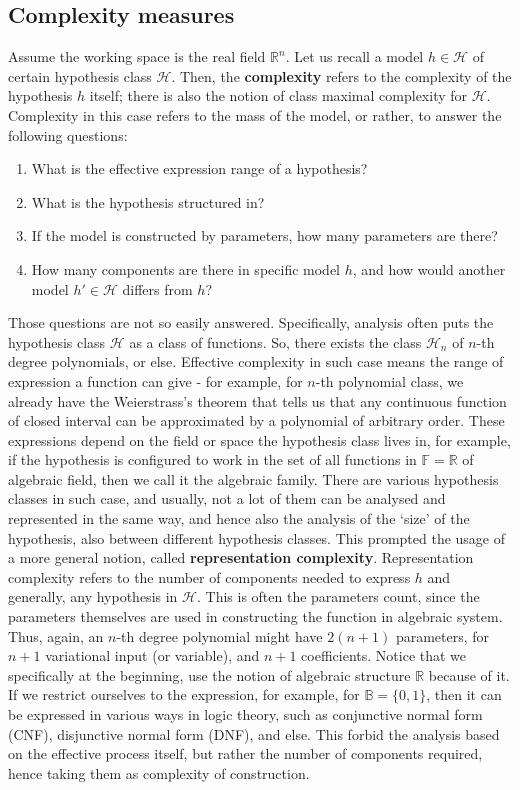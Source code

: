 \documentclass[10pt,oneside,oldfontcommands,dvipsnames,article]{memoir}
\begin{document}
\subsection{Complexity measures}

Assume the working space is the real field $\mathbb{R}^{n}$. Let us recall a model $h\in\mathcal{H}$ of certain hypothesis class $\mathcal{H}$. Then, the \textbf{complexity} refers to the complexity of the hypothesis $h$ itself; there is also the notion of class maximal complexity for $\mathcal{H}$. Complexity in this case refers to the mass of the model, or rather, to answer the following questions:
\begin{enumerate}[itemsep=0.5pt,topsep=0.5pt]
    \item What is the effective expression range of a hypothesis?
    \item What is the hypothesis structured in?
    \item If the model is constructed by parameters, how many parameters are there?
    \item How many components are there in specific model $h$, and how would another model $h'\in \mathcal{H}$ differs from $h$?
\end{enumerate}
Those questions are not so easily answered. Specifically, analysis often puts the hypothesis class $\mathcal{H}$ as a class of functions. So, there exists the class $\mathcal{H}_{n}$ of $n$-th degree polynomials, or else. Effective complexity in such case means the range of expression a function can give - for example, for $n$-th polynomial class, we already have the Weierstrass's theorem that tells us that any continuous function of closed interval can be approximated by a polynomial of arbitrary order. These expressions depend on the field or space the hypothesis class lives in, for example, if the hypothesis is configured to work in the set of all functions in $\mathbb{F}=\mathbb{R}$ of algebraic field, then we call it the algebraic family. There are various hypothesis classes in such case, and usually, not a lot of them can be analysed and represented in the same way, and hence also the analysis of the `size' of the hypothesis, also between different hypothesis classes. This prompted the usage of a more general notion, called \textbf{representation complexity}. Representation complexity refers to the number of components needed to express $h$ and generally, any hypothesis in $\mathcal{H}$. This is often the parameters count, since the parameters themselves are used in constructing the function in algebraic system. Thus, again, an $n$-th degree polynomial might have $2(n+1)$ parameters, for $n+1$ variational input (or variable), and $n+1$ coefficients. Notice that we specifically at the beginning, use the notion of algebraic structure $\mathbb{R}$ because of it. If we restrict ourselves to the expression, for example, for $\mathbb{B}=\{0,1\}$, then it can be expressed in various ways in logic theory, such as conjunctive normal form (CNF), disjunctive normal form (DNF), and else. This forbid the analysis based on the effective process itself, but rather the number of components required, hence taking them as complexity of construction. 
\end{document}
